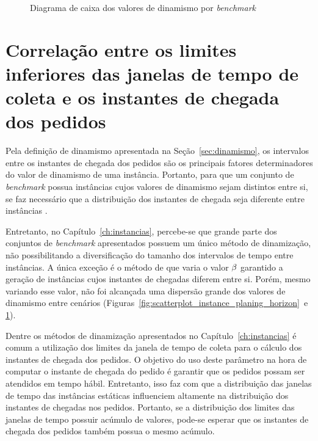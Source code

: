 \begin{figure}[H]
    \centering
    \caption{Diagrama de caixa dos valores de dinamismo por \textit{benchmark}}
    \label{fig:dynamism_boxplot_planing_horizon}
\end{figure}





\section{Correlação entre os limites inferiores das janelas de tempo de coleta 
e os instantes de chegada dos pedidos}

Pela definição de dinamismo apresentada na Seção~\ref{sec:dinamismo}, os 
intervalos entre os instantes de chegada dos pedidos são os principais fatores
determinadores do valor de dinamismo de uma instância.
Portanto, para que um conjunto de \textit{benchmark} possua instâncias cujos 
valores de dinamismo sejam distintos entre si, se faz necessário que a 
distribuição dos instantes de chegada seja diferente entre instâncias 
\cite{van_lon_measures_2016}.

Entretanto, no Capítulo~\ref{ch:instancias}, percebe-se que grande parte dos 
conjuntos de \textit{benchmark} apresentados possuem um único método de 
dinamização, não possibilitando a diversificação do tamanho dos intervalos de 
tempo entre instâncias.
A única exceção é o método de  que varia o 
valor $\beta$ garantido a geração de instâncias cujos instantes de 
chegadas diferem entre si.
Porém, mesmo variando esse valor, não foi alcançada uma dispersão grande 
dos valores de dinamismo entre cenários 
(Figuras~\ref{fig:scatterplot_instance_planing_horizon}~e
\ref{fig:dynamism_boxplot_planing_horizon}).

Dentre os métodos de dinamização apresentados no Capítulo~\ref{ch:instancias} é 
comum a utilização dos limites da janela de tempo de coleta para o cálculo dos 
instantes de chegada dos pedidos.
O objetivo do uso deste parâmetro na hora de computar o instante de chegada do 
pedido é garantir que os pedidos possam ser atendidos em tempo hábil.
Entretanto, isso faz com que a distribuição das janelas de tempo das instâncias
estáticas influenciem altamente na distribuição dos instantes de chegadas nos 
pedidos.
Portanto, se a distribuição dos limites das janelas de tempo possuir acúmulo 
de valores, pode-se esperar que os instantes de chegada dos pedidos também  
possua o mesmo acúmulo.

